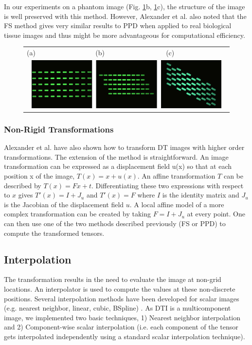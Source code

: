 \documentclass{InsightArticle}
\begin{document}
In our experiments on a phantom image (Fig. \ref{fig:PPDTransformation}b, \ref{fig:PPDTransformation}c), the structure of the image is well preserved with this method.  However, Alexander et al. \cite{Alexander2001} also noted that the FS method gives very similar results to PPD when applied to real biological tissue images and thus might be more advantageous for computational efficiency.

\begin{figure}
\begin{tabularx}{\textwidth}{CCC}
(a) & (b) & (c) \\
\\
\end{tabularx}
\label{fig:PPDTransformation}
\end{figure}


\subsubsection{Non-Rigid Transformations}
Alexander et al. have also shown how to transform DT images with higher order transformations. The extension of the method is straightforward. An image transformation can be expressed as a displacement field u(x) so that at each position x of the image, $T(x) = x + u(x)$. An affine transformation $T$ can be described by $T(x) = F x + t$. Differentiating these two expressions with respect to $x$ gives $T'(x) = I + J_{u}$ and $T'(x) = F$ where $I$ is the identity matrix and $J_{u}$ is the Jacobian of the displacement field $u$. A local affine model of a more complex transformation can be created by taking $F = I + J_{u}$ at every point. One can then use one of the two methods described previously (FS or PPD) to compute the transformed tensors.

\subsection{Interpolation}
The transformation results in the need to evaluate the image at non-grid locations. An interpolator is used to compute the values at these non-discrete positions. Several interpolation methods have been developed for scalar images (e.g. nearest neighbor, linear, cubic, BSpline) \cite{Meijering2002,Meijering2000,Meijering2003}. As DTI is a multicomponent image, we implemented two basic techniques, 1) Nearest neighbor interpolation and 2) Component-wise scalar interpolation (i.e. each component of the tensor gets interpolated independently using a standard scalar interpolation technique).
\end{document}
